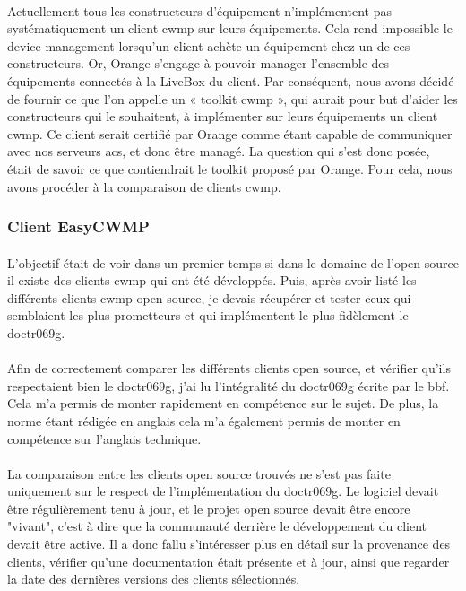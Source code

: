 \documentclass[12pt,a4paper]{report}
\begin{document}
\paragraph*{}Actuellement tous les constructeurs d’équipement n’implémentent pas
systématiquement un client \gls{cwmp} sur leurs équipements. Cela rend impossible le device management lorsqu’un client achète un équipement chez un de ces constructeurs. Or, Orange s’engage à pouvoir manager l’ensemble des équipements connectés à la LiveBox du client. Par conséquent, nous avons décidé de fournir ce que l’on appelle un « toolkit \gls{cwmp} », qui aurait pour but d’aider les constructeurs qui le souhaitent, à implémenter sur leurs équipements un client \gls{cwmp}. Ce client serait certifié par Orange comme étant capable de communiquer avec nos serveurs \gls{acs}, et donc être managé. La question qui s’est donc posée, était de savoir ce que contiendrait le toolkit proposé par Orange. Pour cela, nous avons procéder à la comparaison de clients \gls{cwmp}. \\
\subsubsection{Client EasyCWMP}
\paragraph*{}L’objectif était de voir dans un premier temps si dans le domaine de l’open source il existe des clients \gls{cwmp} qui ont été développés. Puis, après avoir listé les différents clients \gls{cwmp} open source, je devais récupérer et tester ceux qui semblaient les plus prometteurs et qui implémentent le plus fidèlement le \gls{doctr069g}.
\paragraph*{}Afin de correctement comparer les différents clients open source, et vérifier qu’ils respectaient bien le \gls{doctr069g}, j’ai lu l’intégralité du \gls{doctr069g} écrite par le \gls{bbf}. Cela m’a permis de monter rapidement en compétence sur le sujet. De plus, la norme étant rédigée en anglais cela m’a également permis de monter en compétence sur l'anglais technique.
\paragraph*{}La comparaison entre les clients open source trouvés ne s'est pas faite uniquement sur le respect de l'implémentation du \gls{doctr069g}. Le logiciel devait être régulièrement tenu à jour, et le projet open source devait être encore "vivant", c'est à dire que la communauté derrière le développement du client devait être active. Il a donc fallu s'intéresser plus en détail sur la provenance des clients, vérifier qu'une documentation était présente et à jour, ainsi que regarder la date des dernières versions des clients sélectionnés.
\end{document}
